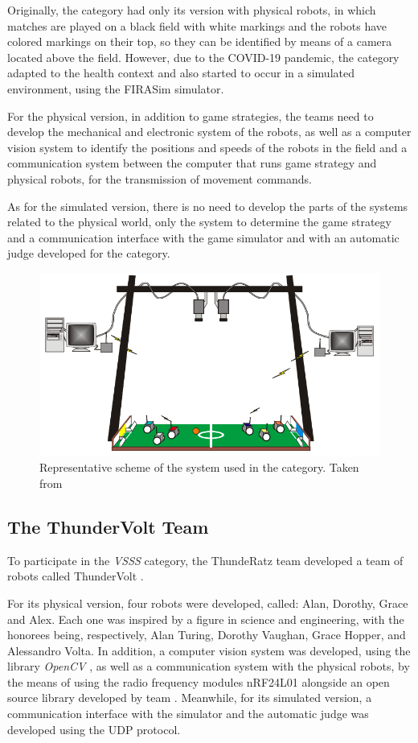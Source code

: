 Originally, the category had only its version with physical robots, in which matches are played on a black field with white markings and the robots have colored markings on their top, so they can be identified by means of a camera located above the field. However, due to the COVID-19 pandemic, the category adapted to the health context and also started to occur in a simulated environment, using the FIRASim \cite{FIRASim} simulator.

For the physical version, in addition to game strategies, the teams need to develop the mechanical and electronic system of the robots, as well as a computer vision system to identify the positions and speeds of the robots in the field and a communication system between the computer that runs game strategy and physical robots, for the transmission of movement commands.

As for the simulated version, there is no need to develop the parts of the systems related to the physical world, only the system to determine the game strategy and a communication interface with the game simulator and with an automatic judge \cite{VSSReferee} developed for the category.

\begin{figure}[!h]
    \centering
    \includegraphics[width=.7\linewidth]{chapters/introduction/images/General System.png}
    \caption{Representative scheme of the system used in the category. Taken from \cite{FutRobosFerramentaDeEnsino}}
    \label{fig:general_system}
\end{figure}

\subsection{The ThunderVolt Team}

To participate in the \textit{VSSS} category, the ThundeRatz team developed a team of robots called ThunderVolt \cite{ThunderVolt, TDPThunderVolt}.

For its physical version, four robots were developed, called: Alan, Dorothy, Grace and Alex. Each one was inspired by a figure in science and engineering, with the honorees being, respectively, Alan Turing, Dorothy Vaughan, Grace Hopper, and Alessandro Volta. In addition, a computer vision system was developed, using the library \textit{OpenCV} \cite{OpenCV}, as well as a communication system with the physical robots, by the means of using the radio frequency modules nRF24L01 alongside an open source library developed by team \cite{STM3232RF24}. Meanwhile, for its simulated version, a communication interface with the simulator and the automatic judge was developed using the UDP protocol.

